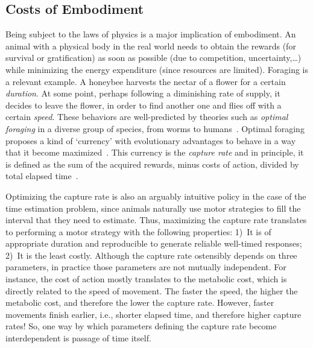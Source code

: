 \subsection{Costs of Embodiment}
\label{ch:intro:cost}
Being subject to the laws of physics is a major implication of embodiment.
An animal with a physical body in the real world needs to obtain the rewards (for survival or gratification) as soon as possible (due to competition, uncertainty,\ldots) while minimizing the energy expenditure (since resources are limited).
Foraging is a relevant example.
A honeybee harvests the nectar of a flower for a certain \textit{duration}.
At some point, perhaps following a diminishing rate of supply, it decides to leave the flower, in order to find another one and flies off with a certain \textit{speed}.
These behaviors are well-predicted by theories such as \emph{optimal foraging} in a diverse group of species, from worms to humans~\cite{Yoon2018PNAS}.
Optimal foraging proposes a kind of `currency' with evolutionary advantages to behave in a way that it become maximized~\cite{Shadmehr2019TINS,Carland2019NeuroSci}.
This currency is the \emph{capture rate} and in principle, it is defined as the sum of the acquired rewards\footnotemark, minus costs of action, divided by total elapsed time~\cite{Shadmehr2019TINS}.
\par
Optimizing the capture rate is also an arguably intuitive policy in the case of the time estimation problem, since animals naturally use motor strategies to fill the interval that they need to estimate.
Thus, maximizing the capture rate translates to performing a motor strategy with the following properties:
    1)~It is of appropriate duration and reproducible to generate reliable well-timed responses;
    2)~It is the least costly.
Although the capture rate ostensibly depends on three parameters, in practice those parameters are not mutually independent.
For instance, the cost of action mostly translates to the metabolic cost, which is directly related to the speed of movement.
The faster the speed, the higher the metabolic cost, and therefore the lower the capture rate.
However, faster movements finish earlier, i.e., shorter elapsed time, and therefore higher capture rates!
So, one way by which parameters defining the capture rate become interdependent is passage of time itself.


